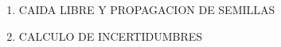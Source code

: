\documentclass{article}
\begin{document}
\begin{enumerate}

\item CAIDA LIBRE Y PROPAGACION DE SEMILLAS
\item CALCULO DE INCERTIDUMBRES
\end{enumerate}
\end{document}
